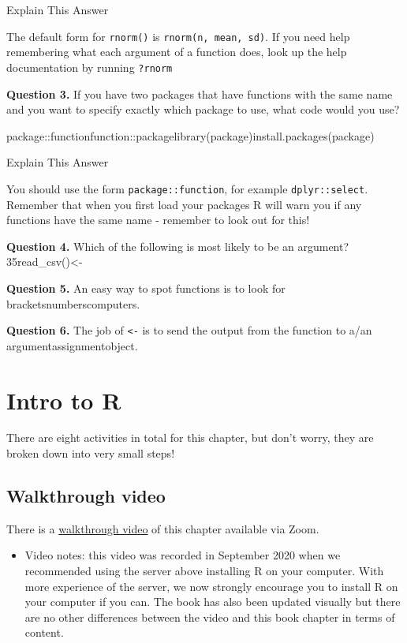 \documentclass[
  oneside]{book}
\providecommand{\tightlist}{%
  \setlength{\itemsep}{0pt}\setlength{\parskip}{0pt}}
\begin{document}
Explain This Answer

The default form for \texttt{rnorm()} is \texttt{rnorm(n,\ mean,\ sd)}. If you need help remembering what each argument of a function does, look up the help documentation by running \texttt{?rnorm}

\textbf{Question 3.} If you have two packages that have functions with the same name and you want to specify exactly which package to use, what code would you use?

package::functionfunction::packagelibrary(package)install.packages(package)

Explain This Answer

You should use the form \texttt{package::function}, for example \texttt{dplyr::select}. Remember that when you first load your packages R will warn you if any functions have the same name - remember to look out for this!

\textbf{Question 4.} Which of the following is most likely to be an argument? 35read\_csv()\textless-

\textbf{Question 5.} An easy way to spot functions is to look for bracketsnumberscomputers.

\textbf{Question 6.} The job of \texttt{\textless{}-} is to send the output from the function to a/an argumentassignmentobject.

\hypertarget{ref1}{%
\chapter{Intro to R}\label{ref1}}

There are eight activities in total for this chapter, but don't worry, they are broken down into very small steps!

\hypertarget{walkthrough-video}{%
\section{Walkthrough video}\label{walkthrough-video}}

There is a \href{https://uofglasgow.zoom.us/rec/play/uJ_2RvnP_UhUF7jM7hQZzOD6KjqjUm1UmPupTfFHBAftxrpMScYWRxkeuzGG0g0RqeE2UBCSmAO5riBo.6AKR_E01noBaq4-b?autoplay=true\&startTime=1600178959000}{walkthrough video} of this chapter available via Zoom.

\begin{itemize}
\tightlist
\item
  Video notes: this video was recorded in September 2020 when we recommended using the server above installing R on your computer. With more experience of the server, we now strongly encourage you to install R on your computer if you can. The book has also been updated visually but there are no other differences between the video and this book chapter in terms of content.
\end{itemize}
\end{document}
